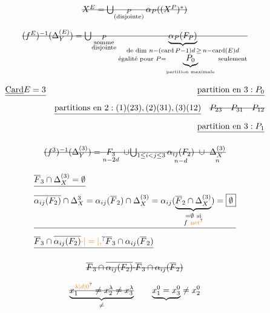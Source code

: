 \[
\deleted{X^E=\bigcup_{\substack{P\\\text{(disjointe)}}}\alpha_P((X^P)^*)}
\]

\[
\deleted{(f^E)^{-1}(\Delta_Y^{(E)})=\bigcup_{\substack{P\\\text{somme}\\\text{disjointe}}}
\underbrace{\alpha_P(F_P)}_{\substack{\text{de dim }n-(\operatorname{card}P-1)d\,\geq\,n-\operatorname{card}(E)d\\
\text{égalité pour }P=\underbrace{P_0}_{\text{partition maximale}}\text{ seulement}}}}
\]

\[
\begin{aligned}
&\deleted{\underline{\operatorname{Card}} E=3} &\deleted{\text{partition en }3:P_0}\\
&&\deleted{\text{partitions en }2:(1)(23),(2)(31),(3)(12)}\quad\deleted{P_{23}\quad P_{31}\quad P_{12}}\\
&&\deleted{\text{partition en }3:P_1}
\end{aligned}
\]

\[
\deleted{(f^3)^{-1}(\Delta_Y^{(3)})=
\underset{n-2d}{F_3}\ \cup\!
\bigcup_{1\leq i<j\leq 3}\underset{n-d}{\alpha_{ij}(F_2)}\ \cup\
\underset{n}{\Delta_X^{(3)}}}
\]



\[
\begin{aligned}
&\deleted{\overline F_3\cap\Delta_X^{(3)}=\emptyset}\\
&\deleted{\overline{\alpha_{ij}(F_2)}\cap\Delta_X^3=\alpha_{ij}(\overline F_2)\cap\Delta_X^{(3)}
=\alpha_{ij}(\underbrace{\overline F_2\cap\Delta_X^{(3)}}_{\substack{=\emptyset\ \text{si}\\f\ \text{\unsure{net}}}})=\boxed{\emptyset}}\\
&\deleted{\overline F_3\cap\overline{\alpha_{ij}(F_2)}\unsure{\mathord{\cdot}|=|,}\overline F_3\cap\alpha_{ij}(\overline F_2)}
\end{aligned}
\]



\[
\deleted{\overline F_3\cap\overline{\alpha_{ij}(F_2)}\mathord{\cdot}\overline F_3\cap\alpha_{ij}(\overline F_2)}
\]

\[
\deleted{\underbrace{x_1^{\unsure{\lambda|d|0}}\ne x_2^\lambda\ne x_3^\lambda}_{\ne}}
\qquad \underbrace{x_1^0=x_3^0}\ne x_2^0
\]

